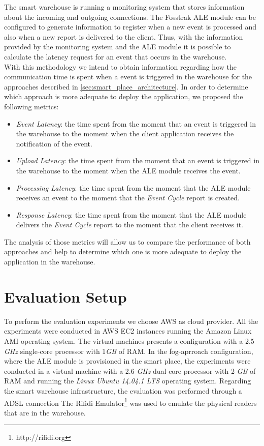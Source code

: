 The smart warehouse is running a monitoring system that stores information about the incoming and outgoing
connections. The Fosstrak \gls{ALE} module can be configured to generate information to register
when a new event is processed and also when a new report is delivered to the client. Thus, with the
information provided by the monitoring system and the \gls{ALE} module it is possible to calculate
the latency request for an event that occurs in the warehouse.\\

With this methodology we intend to obtain information regarding how the communication time is spent
when a event is triggered in the warehouse for the approaches described in \ref{sec:smart_place_architecture}.
In order to determine which approach is more adequate to deploy the application, we proposed the
following metrics:

\begin{itemize}
  \item \textit{Event Latency}: the time spent from the moment that an event is triggered in the
  warehouse to the moment when the client application receives the notification of the event.
  \item \textit{Upload Latency}: the time spent from the moment that an event is triggered in the
  warehouse to the moment when the \gls{ALE} module receives the event.
  \item \textit{Processing Latency}: the time spent from the moment that the \gls{ALE} module
  receives an event to the moment that the \textit{Event Cycle} report is created.
  \item \textit{Response Latency}: the time spent from the moment that the \gls{ALE} module delivers
  the \textit{Event Cycle} report to the moment that the client receives it.
\end{itemize}

The analysis of those metrics will allow us to compare the performance of both approaches and help to
determine which one is more adequate to deploy the application in the warehouse.

\section{Evaluation Setup}
\label{sec:eval_setup}
To perform the evaluation experiments we choose \gls{AWS} as cloud provider. All the experiments were
conducted in \gls{AWS} \gls{EC2} instances running the Amazon Linux AMI operating system. The virtual
machines presents a configuration with a 2.5 \textit{\gls{GHz}} single-core processor with 1\textit{\gls{GB}} of
\gls{RAM}. In the fog-aprroach configuration, where the \gls{ALE} module is provisioned in the smart place,
the experiments were conducted in a virtual machine with a 2.6 \textit{\gls{GHz}} dual-core processor
with 2 \textit{\gls{GB}} of \gls{RAM} and running the \textit{Linux Ubuntu 14.04.1 LTS} operating system.
Regarding the smart warehouse infrastructure, the evaluation was performed through a \gls{ADSL} connection
The Rifidi Emulator\footnote{http://rifidi.org} was used to emulate the physical readers that are
in the warehouse.\\

